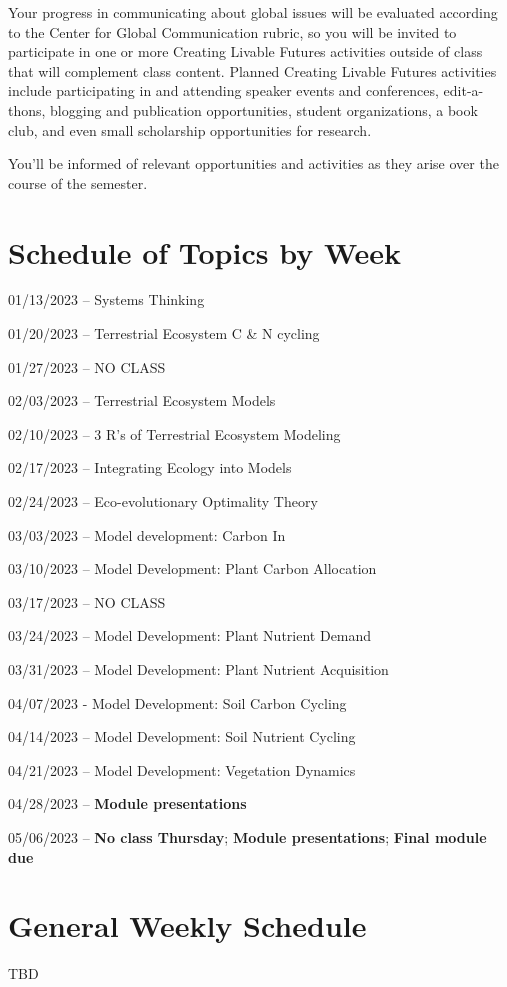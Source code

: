 \documentclass[12pt, notitlepage]{article}   	%
\begin{document}
{Your progress in communicating about global issues will be evaluated according to the 
Center for Global Communication rubric, so you will be invited to participate 
in one or more Creating Livable Futures activities outside of class that will 
complement class content. 
Planned Creating Livable Futures activities include participating in and attending 
speaker events and conferences, edit-a-thons, blogging and publication opportunities, 
student organizations, a book club, and even small scholarship opportunities for research. 

You’ll be informed of relevant opportunities and activities as they arise over 
the course of the semester.

\newpage

\section*{Schedule of Topics by Week}
01/13/2023 – Systems Thinking \par
01/20/2023 – Terrestrial Ecosystem C & N cycling \par
01/27/2023 – NO CLASS \par
02/03/2023 – Terrestrial Ecosystem Models \par
02/10/2023 – 3 R's of Terrestrial Ecosystem Modeling \par
02/17/2023 – Integrating Ecology into Models \par
02/24/2023 – Eco-evolutionary Optimality Theory \par
03/03/2023 – Model development: Carbon In \par
03/10/2023 – Model Development: Plant Carbon Allocation \par
03/17/2023 – NO CLASS \par
03/24/2023 – Model Development: Plant Nutrient Demand \par
03/31/2023 – Model Development: Plant Nutrient Acquisition \par
04/07/2023 - Model Development: Soil Carbon Cycling \par
04/14/2023 – Model Development: Soil Nutrient Cycling \par
04/21/2023 – Model Development: Vegetation Dynamics \par
04/28/2023 – \textbf{Module presentations} \par
05/06/2023 – \textbf{No class Thursday}; \textbf{Module presentations}; \textbf{Final module due} \par

\section*{General Weekly Schedule}
TBD

} %
\end{document}
